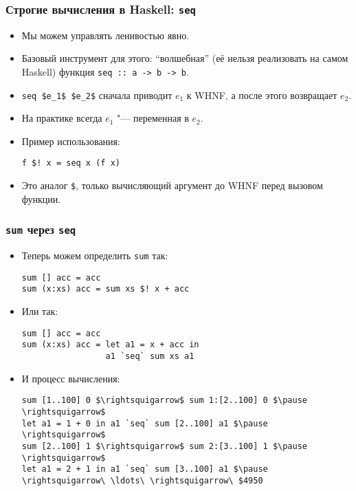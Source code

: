 \documentclass[11pt]{beamer}
\begin{document}
\begin{frame}[fragile]
\frametitle{Строгие вычисления в Haskell: \lstinline|seq|}
\begin{itemize}
    \item Мы можем управлять ленивостью явно.
    \item Базовый инструмент для этого: \enquote{волшебная} (её нельзя реализовать на самом Haskell) функция \lstinline|seq :: a -> b -> b|.
    \pause
    \item \lstinline[mathescape]|seq $e_1$ $e_2$| сначала приводит $e_1$ к WHNF, а после этого возвращает $e_2$.
    \pause
    \item На практике всегда $e_1$ "--- переменная в $e_2$.
    \item Пример использования: 
\begin{lstlisting}[escapeinside=||]
f $! x = seq x (f x)
\end{lstlisting}
    \item Это аналог \lstinline|$|, только вычисляющий аргумент до WHNF перед вызовом функции.    
\end{itemize}
\end{frame}

\begin{frame}[fragile]
\frametitle{\lstinline|sum| через \lstinline|seq|}
\begin{itemize}
    \item Теперь можем определить \lstinline|sum| так:\pause
\begin{lstlisting}[escapeinside=||]
sum [] acc = acc
sum (x:xs) acc = sum xs $! x + acc
\end{lstlisting}
    \item Или так:\pause
\begin{lstlisting}
sum [] acc = acc
sum (x:xs) acc = let a1 = x + acc in 
                 a1 `seq` sum xs a1
\end{lstlisting}
    \item И процесс вычисления:
\begin{lstlisting}[basicstyle=\ttfamily\small,mathescape]
sum [1..100] 0 $\rightsquigarrow$ sum 1:[2..100] 0 $\pause \rightsquigarrow$
let a1 = 1 + 0 in a1 `seq` sum [2..100] a1 $\pause \rightsquigarrow$
sum [2..100] 1 $\rightsquigarrow$ sum 2:[3..100] 1 $\pause \rightsquigarrow$ 
let a1 = 2 + 1 in a1 `seq` sum [3..100] a1 $\pause \rightsquigarrow\ \ldots\ \rightsquigarrow\ $4950
\end{lstlisting}
\end{itemize}
\end{frame}
\end{document}
